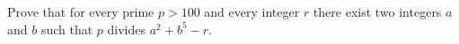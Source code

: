 Prove that for every prime $p > 100$ and every integer $r$ there exist two integers $a$ and $b$ such that $p$ divides $a^{2} + b^{5} - r$.
